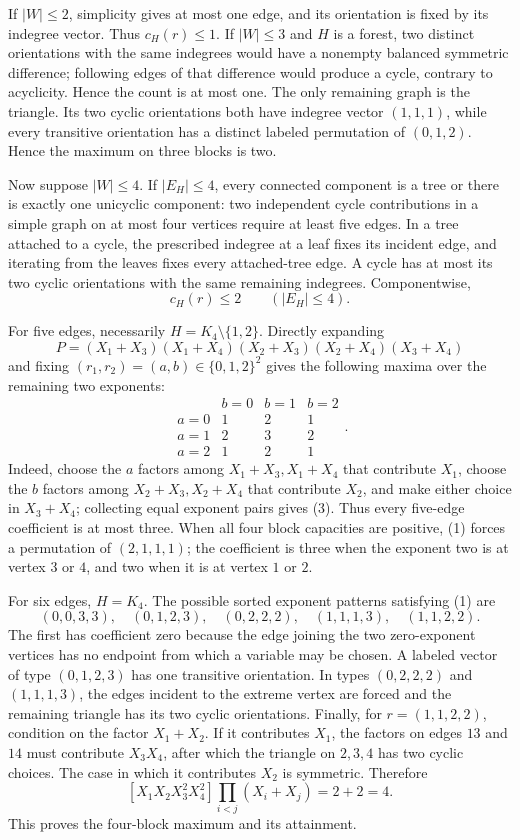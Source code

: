 If \(|W|\leq2\), simplicity gives at most one edge, and its orientation is fixed by its indegree vector. Thus \(c_H(r)\leq1\). If \(|W|\leq3\) and \(H\) is a forest, two distinct orientations with the same indegrees would have a nonempty balanced symmetric difference; following edges of that difference would produce a cycle, contrary to acyclicity. Hence the count is at most one. The only remaining graph is the triangle. Its two cyclic orientations both have indegree vector \((1,1,1)\), while every transitive orientation has a distinct labeled permutation of \((0,1,2)\). Hence the maximum on three blocks is two.

Now suppose \(|W|\leq4\). If \(|E_H|\leq4\), every connected component is a tree or there is exactly one unicyclic component: two independent cycle contributions in a simple graph on at most four vertices require at least five edges. In a tree attached to a cycle, the prescribed indegree at a leaf fixes its incident edge, and iterating from the leaves fixes every attached-tree edge. A cycle has at most its two cyclic orientations with the same remaining indegrees. Componentwise,
\[
 c_H(r)\leq2\qquad (|E_H|\leq4).
 \tag{2}
\]

For five edges, necessarily \(H=K_4\setminus\{1,2\}\). Directly expanding
\[
 P=(X_1+X_3)(X_1+X_4)(X_2+X_3)(X_2+X_4)(X_3+X_4)
\]
and fixing \((r_1,r_2)=(a,b)\in\{0,1,2\}^2\) gives the following maxima over the remaining two exponents:
\[
 \begin{array}{c|ccc}
  &b=0&b=1&b=2\\ \hline
 a=0&1&2&1\\
 a=1&2&3&2\\
 a=2&1&2&1
 \end{array}.
 \tag{3}
\]
Indeed, choose the \(a\) factors among \(X_1+X_3,X_1+X_4\) that contribute \(X_1\), choose the \(b\) factors among \(X_2+X_3,X_2+X_4\) that contribute \(X_2\), and make either choice in \(X_3+X_4\); collecting equal exponent pairs gives (3). Thus every five-edge coefficient is at most three. When all four block capacities are positive, (1) forces a permutation of \((2,1,1,1)\); the coefficient is three when the exponent two is at vertex \(3\) or \(4\), and two when it is at vertex \(1\) or \(2\).

For six edges, \(H=K_4\). The possible sorted exponent patterns satisfying (1) are
\[
 (0,0,3,3),\quad(0,1,2,3),\quad(0,2,2,2),
 \quad(1,1,1,3),\quad(1,1,2,2).
\]
The first has coefficient zero because the edge joining the two zero-exponent vertices has no endpoint from which a variable may be chosen. A labeled vector of type \((0,1,2,3)\) has one transitive orientation. In types \((0,2,2,2)\) and \((1,1,1,3)\), the edges incident to the extreme vertex are forced and the remaining triangle has its two cyclic orientations. Finally, for \(r=(1,1,2,2)\), condition on the factor \(X_1+X_2\). If it contributes \(X_1\), the factors on edges \(13\) and \(14\) must contribute \(X_3X_4\), after which the triangle on \(2,3,4\) has two cyclic choices. The case in which it contributes \(X_2\) is symmetric. Therefore
\[
 [X_1X_2X_3^2X_4^2]\prod_{i<j}(X_i+X_j)=2+2=4.
 \tag{4}
\]
This proves the four-block maximum and its attainment.

